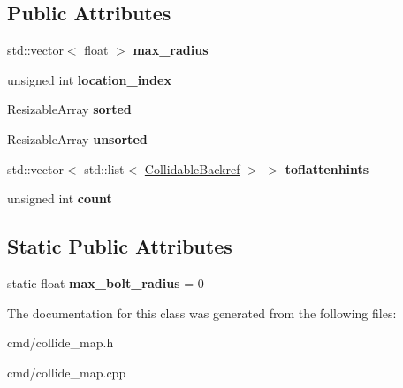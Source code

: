\subsection*{Public Attributes}
\begin{DoxyCompactItemize}
\item 
std\+::vector$<$ float $>$ {\bfseries max\+\_\+radius}\hypertarget{classCollideArray_a770f73dd0bae59b1fc036776b835e6fe}{}\label{classCollideArray_a770f73dd0bae59b1fc036776b835e6fe}

\item 
unsigned int {\bfseries location\+\_\+index}\hypertarget{classCollideArray_ae2c0557c082383a7d6f9c71831a46804}{}\label{classCollideArray_ae2c0557c082383a7d6f9c71831a46804}

\item 
Resizable\+Array {\bfseries sorted}\hypertarget{classCollideArray_a844328f26a010daacb28fb909e2cb57d}{}\label{classCollideArray_a844328f26a010daacb28fb909e2cb57d}

\item 
Resizable\+Array {\bfseries unsorted}\hypertarget{classCollideArray_ac4f37768e5cb842daae5df40c4882f63}{}\label{classCollideArray_ac4f37768e5cb842daae5df40c4882f63}

\item 
std\+::vector$<$ std\+::list$<$ \hyperlink{classCollideArray_1_1CollidableBackref}{Collidable\+Backref} $>$ $>$ {\bfseries toflattenhints}\hypertarget{classCollideArray_a4f174b8698d57e54fe9fda6a6a09ffd4}{}\label{classCollideArray_a4f174b8698d57e54fe9fda6a6a09ffd4}

\item 
unsigned int {\bfseries count}\hypertarget{classCollideArray_aced9e6e2a23a38d0c4fe101da5fbbef3}{}\label{classCollideArray_aced9e6e2a23a38d0c4fe101da5fbbef3}

\end{DoxyCompactItemize}
\subsection*{Static Public Attributes}
\begin{DoxyCompactItemize}
\item 
static float {\bfseries max\+\_\+bolt\+\_\+radius} = 0\hypertarget{classCollideArray_abfc04833c4b6adcefb6c5c19332c9be6}{}\label{classCollideArray_abfc04833c4b6adcefb6c5c19332c9be6}

\end{DoxyCompactItemize}


The documentation for this class was generated from the following files\+:\begin{DoxyCompactItemize}
\item 
cmd/collide\+\_\+map.\+h\item 
cmd/collide\+\_\+map.\+cpp\end{DoxyCompactItemize}
